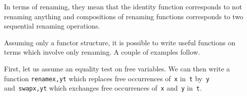 \documentclass[9pt,preprint,authoryear]{sigplanconf}
\begin{document}
%
%


%
In terms of renaming, they mean that the identity function corresponds
    to not renaming anything
    and compositions of renaming functions corresponds to two sequential
    renaming operations.%


%
Assuming only a functor structure, it is possible to write useful
    functions on terms which involve only renaming. A couple of examples
    follow.%


%
First, let us assume an equality test on free variables. 
    We can then write a function
    \textcolor[rgb]{0,0,0.80}{\texttt{rename}}\textcolor[rgb]{0,0,0.80}{\texttt{\mbox{\hspace{0.50em}}}}\textcolor[cmyk]{0,0.65,0.99,0}{\texttt{\makebox[1.22ex][l]{$ {(} $}}}\textcolor[rgb]{0,0,0.80}{\texttt{x,y}}\textcolor[cmyk]{0,0.65,0.99,0}{\texttt{\makebox[1.22ex][r]{$ {)} $}}}\textcolor[rgb]{0,0,0.80}{\texttt{\mbox{\hspace{0.50em}}}}\textcolor[rgb]{0,0,0.80}{\texttt{t}} which replaces free occurrences of{~}\textcolor[rgb]{0,0,0.80}{\texttt{x}} in{~}\textcolor[rgb]{0,0,0.80}{\texttt{t}}    by{~}\textcolor[rgb]{0,0,0.80}{\texttt{y}} and{~}\textcolor[rgb]{0,0,0.80}{\texttt{swap}}\textcolor[rgb]{0,0,0.80}{\texttt{\mbox{\hspace{0.50em}}}}\textcolor[cmyk]{0,0.65,0.99,0}{\texttt{\makebox[1.22ex][l]{$ {(} $}}}\textcolor[rgb]{0,0,0.80}{\texttt{x,y}}\textcolor[cmyk]{0,0.65,0.99,0}{\texttt{\makebox[1.22ex][r]{$ {)} $}}}\textcolor[rgb]{0,0,0.80}{\texttt{\mbox{\hspace{0.50em}}}}\textcolor[rgb]{0,0,0.80}{\texttt{t}} which exchanges free occurrences
    of{~}\textcolor[rgb]{0,0,0.80}{\texttt{x}} and{~}\textcolor[rgb]{0,0,0.80}{\texttt{y}} in{~}\textcolor[rgb]{0,0,0.80}{\texttt{t}}.%


{\nopagebreak }
\end{document}
